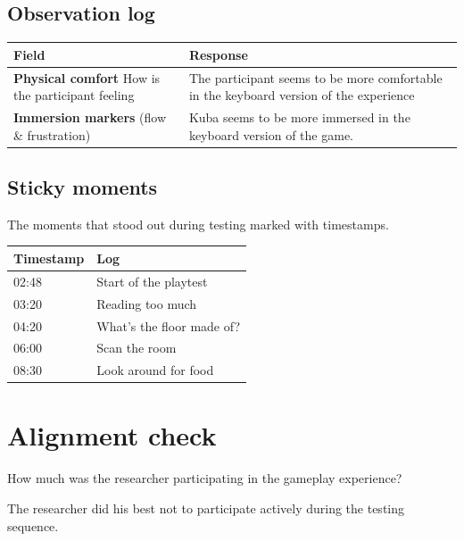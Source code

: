 \subsection{Observation log}
\begin{table}[h]
\centering
\begin{tabular}{|p{5cm}|p{10cm}|}
\hline
\textbf{Field} & \textbf{Response} \\ \hline
\textbf{Physical comfort} How is the participant feeling & The participant seems to be more comfortable in the keyboard version of the experience\\[1.5cm] \hline
\textbf{Immersion markers} (flow \& frustration) & Kuba seems to be more immersed in the keyboard version of the game.\\[1.5cm] \hline
\end{tabular}
\end{table}


\subsection{Sticky moments}
The moments that stood out during testing marked with timestamps.

\begin{table}[h]
\centering
\begin{tabular}{|p{3cm}|p{10cm}|}
\hline
\textbf{Timestamp} & \textbf{Log} \\ \hline
02:48 & Start of the playtest \\ \hline 
03:20 & Reading too much \\ \hline 
04:20 & What's the floor made of? \\ \hline 
06:00 & Scan the room \\ \hline 
08:30 & Look around for food \\ \hline 
\end{tabular}
\end{table}

\section{Alignment check}
How much was the researcher participating in the gameplay experience? 

The researcher did his best not to participate actively during the testing sequence. 



